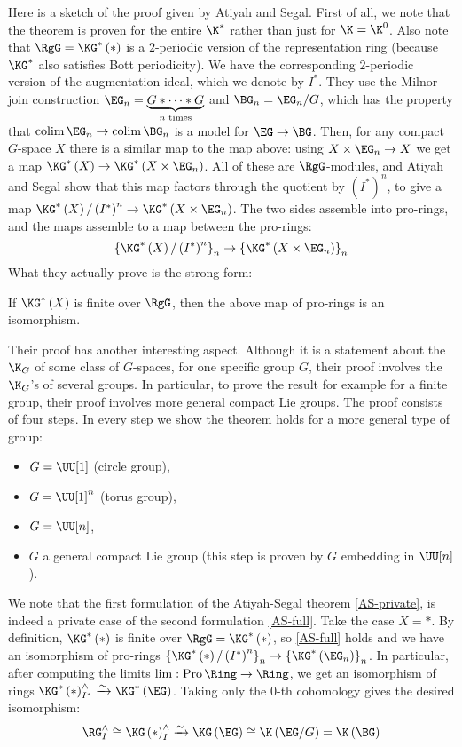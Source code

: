 Here is a sketch of the proof given by Atiyah and Segal.
First of all, we note that the theorem is proven for the entire $\K^*$ rather than just for $\K = \K^0$.
Also note that $\RgG = \KG^*\left(*\right)$ is a $2$-periodic version of the representation ring (because $\KG^*$ also satisfies Bott periodicity).
We have the corresponding $2$-periodic version of the augmentation ideal, which we denote by $I^*$.
They use the Milnor join construction $\EG_n = \underbrace{G * \cdots * G}_{n \text{ times}}$ and $\BG_n = \EG_n/G$, which has the property that $\colim \EG_n \to \colim \BG_n$ is a model for $\EG \to \BG$.
Then, for any compact $G$-space $X$ there is a similar map to the map above: using $X \times \EG_n \to X$ we get a map $\KG^*\left(X\right) \to \KG^*\left(X \times \EG_n\right)$.
All of these are $\RgG$-modules, and Atiyah and Segal show that this map factors through the quotient by $\left(I^*\right)^n$, to give a map $\KG^*\left(X\right)/\left(I^*\right)^n \to \KG^*\left(X \times \EG_n\right)$.
The two sides assemble into pro-rings, and the maps assemble to a map between the pro-rings:
$$
\left\{\KG^*\left(X\right)/\left(I^*\right)^n\right\}_n
\to \left\{\KG^*\left(X \times \EG_n\right)\right\}_n
$$
What they actually prove is the strong form:

\begin{theorem}[{\cite{AS}}]\label{AS-full}
	If $\KG^*\left(X\right)$ is finite over $\RgG$, then the above map of pro-rings is an isomorphism.
\end{theorem}

Their proof has another interesting aspect.
Although it is a statement about the $\K_G$ of some class of $G$-spaces, for one specific group $G$, their proof involves the $\K_G$'s of several groups.
In particular, to prove the result for example for a finite group, their proof involves more general compact Lie groups.
The proof consists of four steps.
In every step we show the theorem holds for a more general type of group:
\begin{itemize}
	\item $G = \UU[1]$ (circle group),
	\item $G = \UU[1]^n$ (torus group),
	\item $G = \UU[n]$,
	\item $G$ a general compact Lie group (this step is proven by $G$ embedding in $\UU[n]$).
\end{itemize}

We note that the first formulation of the Atiyah-Segal theorem \ref{AS-private}, is indeed a private case of the second formulation \ref{AS-full}.
Take the case $X = *$.
By definition, $\KG^*\left(*\right)$ is finite over $\RgG = \KG^*\left(*\right)$, so \ref{AS-full} holds and we have an isomorphism of pro-rings $\left\{\KG^*\left(*\right)/\left(I^*\right)^n\right\}_n \to \left\{\KG^*\left(\EG_n\right)\right\}_n$.
In particular, after computing the limits $\lim: \pro \Ring \to \Ring$, we get an isomorphism of rings $\KG^*\left(*\right)_{I^*}^\wedge \xrightarrow{\sim} \KG^*\left(\EG\right)$.
Taking only the $0$-th cohomology gives the desired isomorphism:
$$
\RG_I^\wedge
\cong \KG\left(*\right)_I^\wedge
\xrightarrow{\sim} \KG\left(\EG\right)
\cong \K\left(\EG/G\right)
= \K\left(\BG\right)
$$




